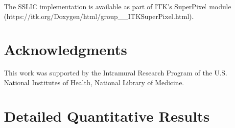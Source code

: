 \documentclass{InsightArticle}
\begin{document}
The SSLIC implementation is available as part of ITK's SuperPixel module (https://itk.org/Doxygen/html/group\_\_ITKSuperPixel.html).

\section*{Acknowledgments}

This work was supported by the Intramural Research Program of the U.S. National Institutes of Health, National
Library of Medicine.




\appendix
	
\newpage
	
\section{Detailed Quantitative Results}
\end{document}
